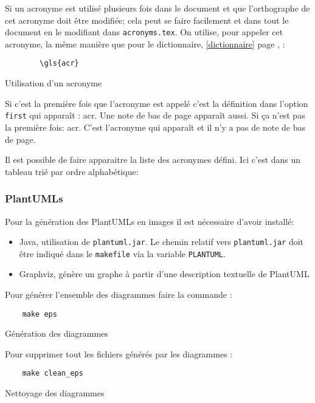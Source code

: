 Si un acronyme est utilisé plusieurs fois dans le document et que l'orthographe de cet acronyme doit être modifiée;
cela peut se faire facilement et dans tout le document en le modifiant dans \verb=acronyms.tex=.
On utilise, pour appeler cet acronyme, la même manière que pour le dictionnaire, \ref{dictionnaire} page \pageref{dictionnaire}, :
\begin{code}
    \begin{verbatim}
        \gls{acr}
\end{verbatim}
    \caption{Utilisation d'un acronyme}
\end{code}

Si c'est la première fois que l'acronyme est appelé c'est la définition dans l'option \verb=first= qui apparaît : \gls{acr}.
Une note de bas de page apparaît aussi. \newline
Si ça n'est pas la première fois: \gls{acr}. C'est l'acronyme qui apparaît et il n'y a pas de note de bas de page.

Il est possible de faire apparaitre la liste des acronymes défini. Ici c'est dans un tableau trié par ordre alphabétique:

\printglossary[type=\acronymtype,style=superheaderborder ,title={Définitions, acronymes et abréviations}]
\glsaddallunused %

\subsubsection{PlantUMLs}
Pour la génération des PlantUMLs en images il est nécessaire d'avoir installé:
\begin{itemize}
    \item Java, utilisation de \verb=plantuml.jar=. Le chemin relatif vers
          \verb=plantuml.jar= doit être indiqué dans le \verb=makefile= via la variable \verb=PLANTUML=.
    \item Graphviz, génère un graphe à partir d'une description textuelle de PlantUML
\end{itemize}

Pour générer l'ensemble des diagrammes faire la commande :
\begin{code}
    \begin{verbatim}
    make eps
\end{verbatim}
    \caption{Génération des diagrammes}
\end{code}

Pour supprimer tout les fichiers générés par les diagrammes :
\begin{code}
    \begin{verbatim}
    make clean_eps
\end{verbatim}
    \caption{Nettoyage des diagrammes}
\end{code}

